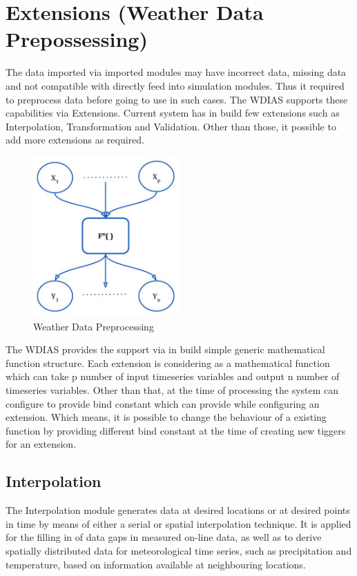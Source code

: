 \section{Extensions (Weather Data Prepossessing)}
The data imported via imported modules may have incorrect data, missing data and not compatible with directly feed into simulation modules. 
Thus it required to preprocess data before going to use in such cases. The WDIAS supports these capabilities via Extensions. Current system has
in build few extensions such as Interpolation, Transformation and Validation. Other than those, it possible to add more extensions as required.
\begin{figure}[htp]
    \centering
    \includegraphics[width=0.5\textwidth]{method/data_preprocess/weather_data_preprocessing.jpg}
    \caption{Weather Data Preprocessing}
    \label{fig:weather_data_preprocessing}
\end{figure}
The WDIAS provides the support via in build simple generic mathematical function structure. Each extension is considering as a mathematical function which can take p 
number of input timeseries variables and output n number of timeseries variables. Other than that, at the time of processing the system can configure to provide
bind constant which can provide while configuring an extension. Which means, it is possible to change the behaviour of a existing function by providing different bind
constant at the time of creating new tiggers for an extension.

\subsection{Interpolation}
The Interpolation module generates data at desired locations or at desired points in time by means of either a serial or spatial interpolation technique. It is applied for the filling in of data gaps in measured on-line data, as well as to derive spatially distributed data for meteorological time series, such as precipitation and temperature, based on information available at neighbouring locations.

